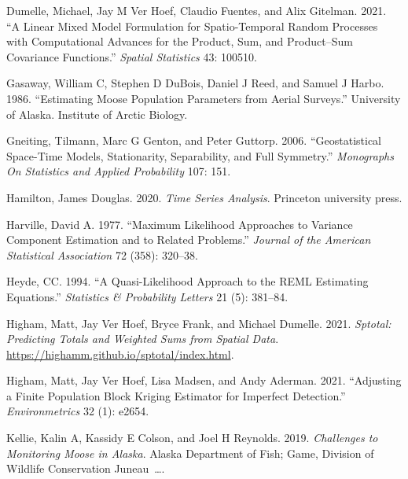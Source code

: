 \documentclass[]{article}    %
\newlength{\cslhangindent}
\newlength{\cslentryspacingunit} %
\newenvironment{CSLReferences}[2] %
 {%
  \setlength{\parindent}{0pt}
  \ifodd #1
  \let\oldpar\par
  \def\par{\hangindent=\cslhangindent\oldpar}
  \fi
  \setlength{\parskip}{#2\cslentryspacingunit}
 }%
 {}
\begin{document}
\begin{CSLReferences}{1}{0}
\leavevmode{}%
Dumelle, Michael, Jay M Ver Hoef, Claudio Fuentes, and Alix Gitelman.
2021. {``A Linear Mixed Model Formulation for Spatio-Temporal Random
Processes with Computational Advances for the Product, Sum, and
Product--Sum Covariance Functions.''} \emph{Spatial Statistics} 43:
100510.

\leavevmode{}%
Gasaway, William C, Stephen D DuBois, Daniel J Reed, and Samuel J Harbo.
1986. {``Estimating Moose Population Parameters from Aerial Surveys.''}
University of Alaska. Institute of Arctic Biology.

\leavevmode{}%
Gneiting, Tilmann, Marc G Genton, and Peter Guttorp. 2006.
{``Geostatistical Space-Time Models, Stationarity, Separability, and
Full Symmetry.''} \emph{Monographs On Statistics and Applied
Probability} 107: 151.

\leavevmode{}%
Hamilton, James Douglas. 2020. \emph{Time Series Analysis}. Princeton
university press.

\leavevmode{}%
Harville, David A. 1977. {``Maximum Likelihood Approaches to Variance
Component Estimation and to Related Problems.''} \emph{Journal of the
American Statistical Association} 72 (358): 320--38.

\leavevmode{}%
Heyde, CC. 1994. {``A Quasi-Likelihood Approach to the REML Estimating
Equations.''} \emph{Statistics \& Probability Letters} 21 (5): 381--84.

\leavevmode{}%
Higham, Matt, Jay Ver Hoef, Bryce Frank, and Michael Dumelle. 2021.
\emph{Sptotal: Predicting Totals and Weighted Sums from Spatial Data}.
\url{https://highamm.github.io/sptotal/index.html}.

\leavevmode{}%
Higham, Matt, Jay Ver Hoef, Lisa Madsen, and Andy Aderman. 2021.
{``Adjusting a Finite Population Block Kriging Estimator for Imperfect
Detection.''} \emph{Environmetrics} 32 (1): e2654.

\leavevmode{}%
Kellie, Kalin A, Kassidy E Colson, and Joel H Reynolds. 2019.
\emph{Challenges to Monitoring Moose in Alaska}. Alaska Department of
Fish; Game, Division of Wildlife Conservation Juneau~\ldots.


\end{CSLReferences}
\end{document}

